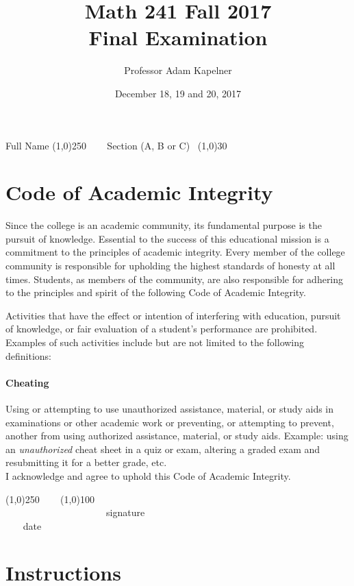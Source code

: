 \documentclass[12pt]{article}
\title{Math 241 Fall 2017 \\ Final Examination}
\author{Professor Adam Kapelner}
\date{December 18, 19 and 20, 2017}
\begin{document}
\maketitle

\noindent Full Name \line(1,0){250} ~~~ Section (A, B or C)~ \line(1,0){30}

\thispagestyle{empty}

\section*{Code of Academic Integrity}

\footnotesize
Since the college is an academic community, its fundamental purpose is the pursuit of knowledge. Essential to the success of this educational mission is a commitment to the principles of academic integrity. Every member of the college community is responsible for upholding the highest standards of honesty at all times. Students, as members of the community, are also responsible for adhering to the principles and spirit of the following Code of Academic Integrity.

Activities that have the effect or intention of interfering with education, pursuit of knowledge, or fair evaluation of a student's performance are prohibited. Examples of such activities include but are not limited to the following definitions:

\paragraph{Cheating} Using or attempting to use unauthorized assistance, material, or study aids in examinations or other academic work or preventing, or attempting to prevent, another from using authorized assistance, material, or study aids. Example: using an \emph{unauthorized} cheat sheet in a quiz or exam, altering a graded exam and resubmitting it for a better grade, etc.
\\

\noindent I acknowledge and agree to uphold this Code of Academic Integrity. \\

\begin{center}
\line(1,0){250} ~~~ \line(1,0){100}\\
~~~~~~~~~~~~~~~~~~~~~signature~~~~~~~~~~~~~~~~~~~~~~~~~~~~~~~~~~~~~~~~~~~~~ date
\end{center}

\normalsize

\section*{Instructions}
\end{document}
